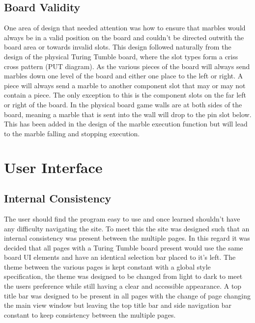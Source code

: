 \documentclass{l4proj}
\begin{document}
\subsection{Board Validity}
One area of design that needed attention was how to ensure that marbles would always be in a valid position on the board and couldn't be directed outwith the board area or towards invalid slots. This design followed naturally from the design of the physical Turing Tumble board, where the slot types form a criss cross pattern (PUT diagram). As the various pieces of the board will always send marbles down one level of the board and either one place to the left or right. A piece will always send a marble to another component slot that may or may not contain a piece. The only exception to this is the component slots on the far left or right of the board. In the physical board game walls are at both sides of the board, meaning a marble that is sent into the wall will drop to the pin slot below. This has been added in the design of the marble execution function but will lead to the marble falling and stopping execution.

\section{User Interface}
\subsection{Internal Consistency}
The user should find the program easy to use and once learned shouldn't have any difficulty navigating the site. To meet this the site was designed such that an internal consistency was present between the multiple pages. In this regard it was decided that all pages with a Turing Tumble board present would use the same board UI elements and have an identical selection bar placed to it's left. The theme between the various pages is kept constant with a global style specification, the theme was designed to be changed from light to dark to meet the users preference while still having a clear and accessible appearance. A top title bar was designed to be present in all pages with the change of page changing the main view window but leaving the top title bar and side navigation bar constant to keep consistency between the multiple pages.
\end{document}
